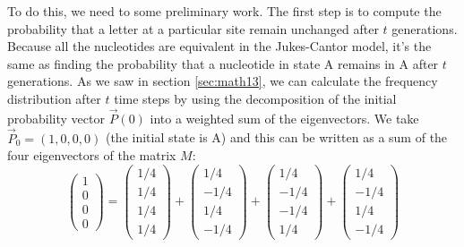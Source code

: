 \documentclass[
  letterpaper,
  DIV=11,
  numbers=noendperiod]{scrreprt}
\begin{document}
To do this, we need to some preliminary work. The first step is to
compute the probability that a letter at a particular site remain
unchanged after \(t\) generations. Because all the nucleotides are
equivalent in the Jukes-Cantor model, it's the same as finding the
probability that a nucleotide in state A remains in A after \(t\)
generations. As we saw in section \ref{sec:math13}, we can calculate the
frequency distribution after \(t\) time steps by using the decomposition
of the initial probability vector \(\vec P(0)\) into a weighted sum of
the eigenvectors. We take \(\vec P_0 = (1,0,0,0)\) (the initial state is
A) and this can be written as a sum of the four eigenvectors of the
matrix \(M\):
\[ \left(\begin{array}{c} 1 \\ 0 \\ 0 \\ 0 \end{array}\right) = \left(\begin{array}{c} 1/4 \\ 1/4 \\ 1/4 \\ 1/4 \end{array}\right) + \left(\begin{array}{c} 1/4 \\ -1/4 \\ 1/4 \\ -1/4 \end{array}\right) +  \left(\begin{array}{c} 1/4 \\ -1/4 \\ -1/4 \\ 1/4 \end{array}\right) + \left(\begin{array}{c} 1/4 \\ -1/4 \\ 1/4 \\ -1/4 \end{array}\right) \]
\end{document}
